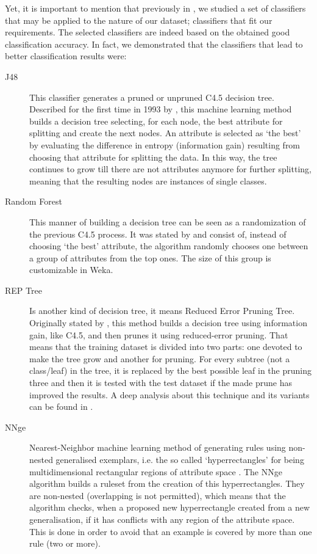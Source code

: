 \documentclass{llncs}
\begin{document}
Yet, it is important to mention that previously in \cite{ECTA}, we studied a set of classifiers that may be applied to the nature of our dataset; classifiers that fit our requirements. The selected classifiers are indeed based on the obtained good classification accuracy. In fact, we demonstrated that the classifiers that lead to better classification results were:

\begin{description}


 \item[J48] This classifier generates a pruned or unpruned C4.5 decision tree. Described for the first time in 1993 by \cite{Quinlan1993}, this machine learning method builds a decision tree selecting, for each node, the best attribute for splitting and create the next nodes. An attribute is selected as `the best' by evaluating the difference in entropy (information gain) resulting from choosing that attribute for splitting the data. In this way, the tree continues to grow till there are not attributes anymore for further splitting, meaning that the resulting nodes are instances of single classes.


\item[Random Forest] This manner of building a decision tree can be seen as a randomization of the previous C4.5 process. It was stated by \cite{Breiman2001} and consist of, instead of choosing `the best' attribute, the algorithm randomly chooses one between a group of attributes from the top ones. The size of this group is customizable in Weka.

\item[REP Tree] Is another kind of decision tree, it means Reduced Error Pruning Tree. Originally stated by \cite{Quinlan1987}, this method builds a decision tree using information gain, like C4.5, and then prunes it using reduced-error pruning. That means that the training dataset is divided into  two parts: one devoted to make the tree grow and another for pruning. For every subtree (not a class/leaf) in the tree, it is replaced by the best possible leaf in the pruning three and then it is tested with the test dataset if the made prune has improved the results. A deep analysis about this technique and its variants can be found in \cite{Elomaa2001}.

\item[NNge] Nearest-Neighbor machine learning method of generating rules using non-nested generalised exemplars, i.e. the so called `hyperrectangles' for being multidimensional rectangular regions of attribute space \cite{Martin1995}. The NNge algorithm builds a ruleset from the creation of this hyperrectangles. They are non-nested (overlapping is not permitted), which means that the algorithm checks, when a proposed new hyperrectangle created from a new generalisation, if it has conflicts with any region of the attribute space. This is done in order to avoid that an example is covered by more than one rule (two or more).


\end{description}
\end{document}

